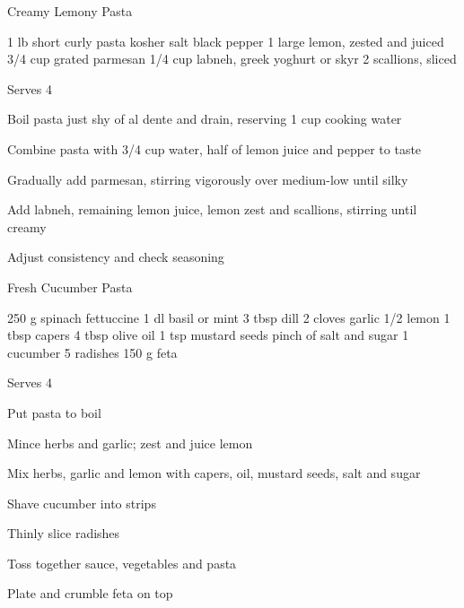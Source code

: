 \begin{recipe}{Creamy Lemony Pasta}{\vegetarian{}}
\begin{ingredients}
1 lb short curly pasta
kosher salt
black pepper
1 large lemon, zested and juiced
3/4 cup grated parmesan
1/4 cup labneh, greek yoghurt or skyr
2 scallions, sliced
\end{ingredients}
\nextcolumn
Serves 4
\begin{steps}
\item Boil pasta just shy of al dente and drain, reserving 1 cup cooking water
\item Combine pasta with 3/4 cup water, half of lemon juice and pepper to taste
\item Gradually add parmesan, stirring vigorously over medium-low until silky
\item Add labneh, remaining lemon juice, lemon zest and scallions, stirring until creamy
\item Adjust consistency and check seasoning
\end{steps}
\end{recipe}

\begin{denserecipe}{Fresh Cucumber Pasta}{\vegetarian{}}
\begin{ingredients}
250 g spinach fettuccine
1 dl basil or mint
3 tbsp dill
2 cloves garlic
1/2 lemon
1 tbsp capers
4 tbsp olive oil
1 tsp mustard seeds
pinch of salt and sugar
1 cucumber
5 radishes
150 g feta
\end{ingredients}
\nextcolumn
Serves 4
\begin{steps}
    \item Put pasta to boil
    \item Mince herbs and garlic; zest and juice lemon
    \item Mix herbs, garlic and lemon with capers, oil, mustard seeds, salt and sugar
    \item Shave cucumber into strips
    \item Thinly slice radishes
    \item Toss together sauce, vegetables and pasta
    \item Plate and crumble feta on top
\end{steps}
\end{denserecipe}

